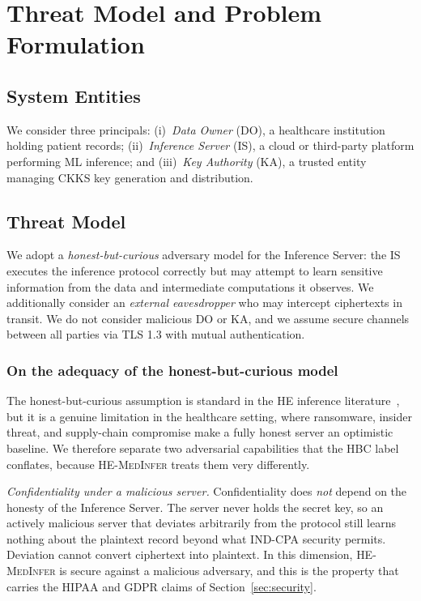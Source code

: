 \documentclass[journal,compsoc]{IEEEtran}
\newcommand{\framework}{\textsc{HE-MedInfer}}
\begin{document}
\section{Threat Model and Problem Formulation}
\label{sec:threat}

\subsection{System Entities}

We consider three principals: (i)~\emph{Data Owner} (DO), a healthcare
institution holding patient records; (ii)~\emph{Inference Server} (IS), a
cloud or third-party platform performing ML inference; and
(iii)~\emph{Key Authority} (KA), a trusted entity managing CKKS key generation
and distribution.

\subsection{Threat Model}

We adopt a \emph{honest-but-curious} adversary model for the Inference Server:
the IS executes the inference protocol correctly but may attempt to learn
sensitive information from the data and intermediate computations it observes.
We additionally consider an \emph{external eavesdropper} who may intercept
ciphertexts in transit. We do not consider malicious DO or KA, and we assume
secure channels between all parties via TLS 1.3 with mutual authentication.

\subsubsection*{On the adequacy of the honest-but-curious model}

The honest-but-curious assumption is standard in the HE inference
literature~\cite{gilad2016cryptonets,lee2022privacypreserving,sav2021poseidon},
but it is a genuine limitation in the healthcare setting, where ransomware,
insider threat, and supply-chain compromise make a fully honest server an
optimistic baseline. We therefore separate two adversarial capabilities that
the HBC label conflates, because \framework{} treats them very differently.

\emph{Confidentiality under a malicious server.} Confidentiality does
\emph{not} depend on the honesty of the Inference Server. The server never
holds the secret key, so an actively malicious server that deviates
arbitrarily from the protocol still learns nothing about the plaintext record
beyond what IND-CPA security permits. Deviation cannot convert ciphertext into
plaintext. In this dimension, \framework{} is secure against a malicious
adversary, and this is the property that carries the HIPAA and GDPR claims of
Section~\ref{sec:security}.
\end{document}
